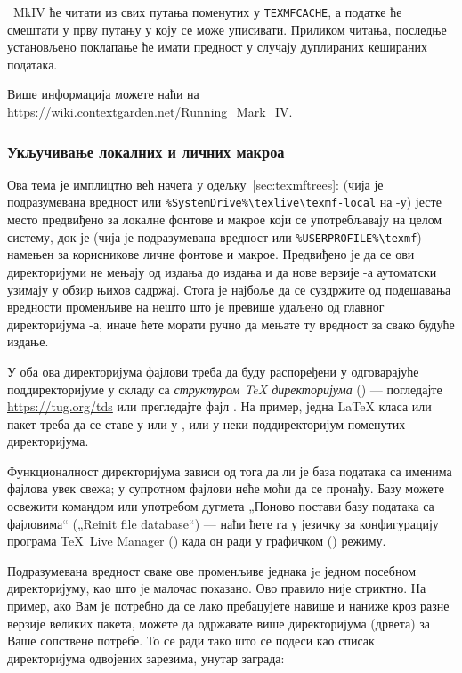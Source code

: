 \documentclass{article}
\begin{document}
\ConTeXt\ MkIV ће читати из свих путања поменутих у
\verb+TEXMFCACHE+, а податке ће смештати у прву путању у коју се може
уписивати. Приликом читања, последње установљено поклапање ће имати
предност у случају дуплираних кешираних података.

Више информација можете наћи на
\url{https://wiki.contextgarden.net/Running_Mark_IV}.


\subsubsection{Укључивање локалних и личних макроа}
\label{sec:local-personal-macros}

Ова тема је имплицтно већ начета у одељку~\ref{sec:texmftrees}:
 (чија је подразумевана вредност
 или
\verb|%SystemDrive%\texlive\texmf-local| на \Windows-у) јесте место
предвиђено за локалне фонтове и макрое који се употребљавају на целом
систему, док је  (чија је подразумевана вредност
 или \verb|%USERPROFILE%\texmf|) намењен за
корисникове личне фонтове и макрое. Предвиђено је да се ови
директоријуми не мењају од издања до издања и да нове верзије \TL{}-а
аутоматски узимају у обзир њихов садржај. Стога је најбоље да се
суздржите од подешавања вредности променљиве  на
нешто што је превише удаљено од главног директоријума \TL{}-а, иначе
ћете морати ручно да мењате ту вредност за свако будуће издање.

У оба ова директоријума фајлови треба да буду распоређени у
одговарајуће поддиректоријуме у складу са \emph{структуром \TeX{}
директоријума} (\TDS) --- погледајте \url{https://tug.org/tds} или
прегледајте фајл . На пример,
једна \LaTeX{} класа или пакет треба да се ставе у
 или у ,
или у неки поддиректоријум поменутих директоријума.

Функционалност директоријума  зависи од тога да
ли је база података са именима фајлова увек свежа; у супротном фајлови
неће моћи да се пронађу. Базу можете освежити командом
 или употребом дугмета „Поново постави базу
података са фајловима“ („\textenglish{Reinit file database}“) --- наћи
ћете га у језичку за конфигурацију програма \TeX\ Live Manager
() када он ради у графичком (\GUI) режиму.

Подразумевана вредност сваке ове променљиве једнака je једном посебном
директоријуму, као што је малочас показано. Ово правило није стриктно.
На пример, ако Вам је потребно да се лако пребацујете навише и наниже
кроз разне верзије великих пакета, можете да одржавате више
директоријума (дрвета) за Ваше сопствене потребе. То се ради тако што
се  подеси као списак директоријума одвојених
зарезима, унутар заграда:
\end{document}
